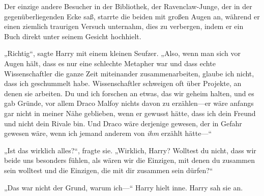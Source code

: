Der einzige andere Besucher in der Bibliothek, der Ravenclaw-Junge, der in der gegenüberliegenden Ecke saß, starrte die beiden mit großen Augen an, während er einen ziemlich traurigen Versuch unternahm, dies zu verbergen, indem er ein Buch direkt unter seinem Gesicht hochhielt.

„Richtig“, sagte Harry mit einem kleinen Seufzer. „Also, wenn man sich vor Augen hält, dass es nur eine schlechte Metapher war und dass echte Wissenschaftler die ganze Zeit miteinander zusammenarbeiten, glaube ich nicht, dass ich geschummelt habe. Wissenschaftler schweigen oft über Projekte, an denen sie arbeiten. Du und ich forschen an etwas, das wir geheim halten, und es gab Gründe, vor allem Draco Malfoy nichts davon zu erzählen—er wäre anfangs gar nicht in meiner Nähe geblieben, wenn er gewusst hätte, dass ich dein Freund und nicht dein Rivale bin. Und Draco wäre derjenige gewesen, der in Gefahr gewesen wäre, wenn ich jemand anderem von \emph{ihm} erzählt hätte—“

„Ist das wirklich alles?“, fragte sie. „Wirklich, Harry? Wolltest du nicht, dass wir beide uns besonders fühlen, als wären wir die Einzigen, mit denen du zusammen sein wolltest und die Einzigen, die mit dir zusammen sein dürfen?“



„Das war nicht der Grund, warum ich—“ Harry hielt inne. Harry sah sie an.

